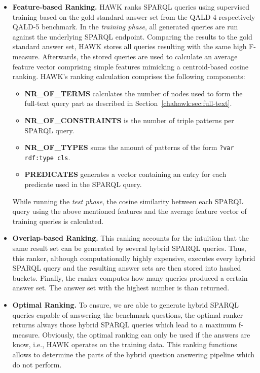 \begin{itemize}
\item \textbf{Feature-based Ranking.} 
HAWK ranks SPARQL queries using supervised training based on the gold standard answer set from the \ac{QALD} 4 respectively \ac{QALD}-5  benchmark.
In the \emph{training phase}, all generated queries are run against the underlying SPARQL endpoint. 
Comparing the results to the gold standard answer set, HAWK stores all queries resulting with the same high F-measure.
Afterwards, the stored queries are used to calculate an average feature vector comprising simple features mimicking a centroid-based cosine ranking.
HAWK's ranking calculation comprises the following components:
\begin{itemize}
\item \textbf{NR\_OF\_TERMS} calculates the number of nodes used to form the full-text query part as described in Section~\ref{chahawk:sec:full-text}.
\item \textbf{NR\_OF\_CONSTRAINTS} is the number of triple patterns per SPARQL query.
\item \textbf{NR\_OF\_TYPES} sums the amount of patterns of the form \texttt{?var rdf:type cls}.
\item \textbf{PREDICATES} generates a vector containing an entry for each predicate used in the SPARQL query.
\end{itemize}
While running the \emph{test phase}, the cosine similarity between each SPARQL query using the above mentioned features and the average feature vector of training queries is calculated.

\item \textbf{Overlap-based Ranking.} This ranking accounts for the intuition that the same result set can be generated by several hybrid SPARQL queries. 
    Thus, this ranker, although computationally highly expensive, executes every hybrid SPARQL query and the resulting answer sets are then stored into hashed buckets. 
    Finally, the ranker computes how many queries produced a certain answer set. 
    The answer set with the highest number is than returned.
    
    \item \textbf{Optimal Ranking.} To ensure, we are able to generate hybrid SPARQL queries capable of answering the benchmark questions, the optimal ranker returns always those hybrid SPARQL queries which lead to a maximum f-measure.  
    Obviously, the optimal ranking can only be used if the answers are know, i.e., HAWK operates on the training data.
    This ranking functions allows to determine the parts of the hybrid question answering pipeline which do not perform. 

\end{itemize}


